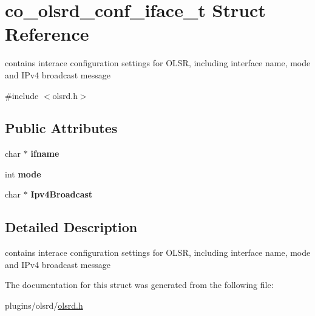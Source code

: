 \hypertarget{structco__olsrd__conf__iface__t}{\section{co\+\_\+olsrd\+\_\+conf\+\_\+iface\+\_\+t Struct Reference}
\label{structco__olsrd__conf__iface__t}
}


contains interace configuration settings for O\+L\+S\+R, including interface name, mode and I\+Pv4 broadcast message  




{\ttfamily \#include $<$olsrd.\+h$>$}

\subsection*{Public Attributes}
\begin{DoxyCompactItemize}
\item 
\hypertarget{structco__olsrd__conf__iface__t_aecf916b03bd929f233bebfdc929464f6}{char $\ast$ {\bfseries ifname}}\label{structco__olsrd__conf__iface__t_aecf916b03bd929f233bebfdc929464f6}

\item 
\hypertarget{structco__olsrd__conf__iface__t_ae627b089d737158dff982be7bd459f8a}{int {\bfseries mode}}\label{structco__olsrd__conf__iface__t_ae627b089d737158dff982be7bd459f8a}

\item 
\hypertarget{structco__olsrd__conf__iface__t_ac21895ab67b73a882cb77595409fdec2}{char $\ast$ {\bfseries Ipv4\+Broadcast}}\label{structco__olsrd__conf__iface__t_ac21895ab67b73a882cb77595409fdec2}

\end{DoxyCompactItemize}


\subsection{Detailed Description}
contains interace configuration settings for O\+L\+S\+R, including interface name, mode and I\+Pv4 broadcast message 

The documentation for this struct was generated from the following file\+:\begin{DoxyCompactItemize}
\item 
plugins/olsrd/\hyperlink{olsrd_8h}{olsrd.\+h}\end{DoxyCompactItemize}
